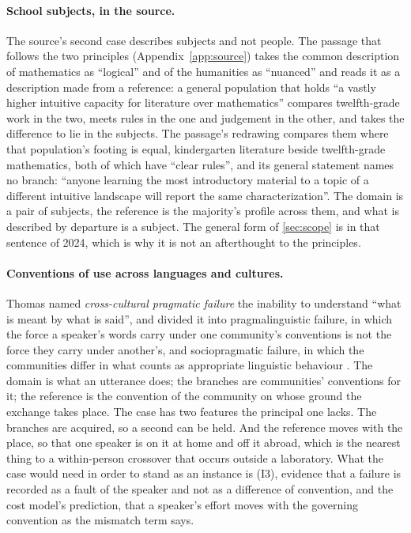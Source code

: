 \paragraph{School subjects, in the source.} The source's second case describes subjects and not people. The passage that follows the two principles (Appendix~\ref{app:source}) takes the common description of mathematics as ``logical'' and of the humanities as ``nuanced'' and reads it as a description made from a reference: a general population that holds ``a vastly higher intuitive capacity for literature over mathematics'' compares twelfth-grade work in the two, meets rules in the one and judgement in the other, and takes the difference to lie in the subjects. The passage's redrawing compares them where that population's footing is equal, kindergarten literature beside twelfth-grade mathematics, both of which have ``clear rules'', and its general statement names no branch: ``anyone learning the most introductory material to a topic of a different intuitive landscape will report the same characterization''. The domain is a pair of subjects, the reference is the majority's profile across them, and what is described by departure is a subject. The general form of \autoref{sec:scope} is in that sentence of 2024, which is why it is not an afterthought to the principles.

\paragraph{Conventions of use across languages and cultures.} Thomas named \emph{cross-cultural pragmatic failure} the inability to understand ``what is meant by what is said'', and divided it into pragmalinguistic failure, in which the force a speaker's words carry under one community's conventions is not the force they carry under another's, and sociopragmatic failure, in which the communities differ in what counts as appropriate linguistic behaviour \cite{Thomas1983}. The domain is what an utterance does; the branches are communities' conventions for it; the reference is the convention of the community on whose ground the exchange takes place. The case has two features the principal one lacks. The branches are acquired, so a second can be held. And the reference moves with the place, so that one speaker is on it at home and off it abroad, which is the nearest thing to a within-person crossover that occurs outside a laboratory. What the case would need in order to stand as an instance is (I3), evidence that a failure is recorded as a fault of the speaker and not as a difference of convention, and the cost model's prediction, that a speaker's effort moves with the governing convention as the mismatch term says.


